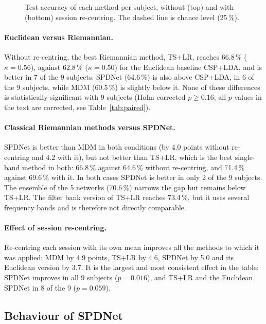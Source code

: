 \begin{figure}[htbp]
  \centering
  \caption{Test accuracy of each method per subject, without (top) and with (bottom) session re-centring. The dashed line is chance level (25\,\%).}
  \label{fig:comparison}
\end{figure}

\paragraph{Euclidean versus Riemannian.}
Without re-centring, the best Riemannian method, TS+LR, reaches 66.8\,\% ($\kappa = 0.56$), against 62.8\,\% ($\kappa = 0.50$) for the Euclidean baseline CSP+LDA, and is better in 7 of the 9 subjects. SPDNet (64.6\,\%) is also above CSP+LDA, in 6 of the 9 subjects, while MDM (60.5\,\%) is slightly below it. None of these differences is statistically significant with 9 subjects (Holm-corrected $p \geq 0.16$; all $p$-values in the text are corrected, see Table~\ref{tab:paired}). 

\paragraph{Classical Riemannian methods versus SPDNet.}
SPDNet is better than MDM in both conditions (by 4.0 points without re-centring and 4.2 with it), but not better than TS+LR, which is the best single-band method in both: 66.8\,\% against 64.6\,\% without re-centring, and 71.4\,\% against 69.6\,\% with it. In both cases SPDNet is better in only 2 of the 9 subjects. The ensemble of the 5 networks (70.6\,\%) narrows the gap but remains below TS+LR. The filter bank version of TS+LR reaches 73.4\,\%, but it uses several frequency bands and is therefore not directly comparable.

\paragraph{Effect of session re-centring.}
Re-centring each session with its own mean improves all the methods to which it was applied: MDM by 4.9 points, TS+LR by 4.6, SPDNet by 5.0 and its Euclidean version by 3.7. It is the largest and most consistent effect in the table: SPDNet improves in all 9 subjects ($p = 0.016$), and TS+LR and the Euclidean SPDNet in 8 of the 9 ($p = 0.059$).

\subsection{Behaviour of SPDNet}
\label{sec:spdnet_results}

